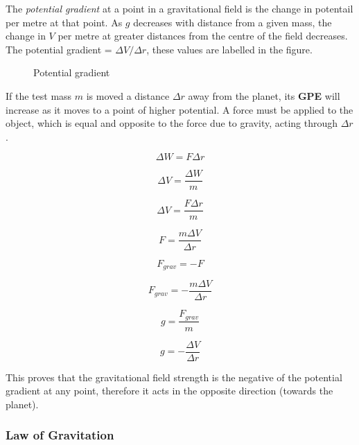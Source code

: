 \documentclass[12pt]{article}
\begin{document}
The \emph{potential gradient} at a point in a gravitational field is the change in potentail per metre at that point. As \(g\) decreases with distance from a given mass, the change in \(V\) per metre at greater distances from the centre of the field decreases. The potential gradient = \(\Delta V / \Delta r\), these values are labelled in the figure.

\begin{figure}[H]
\centering
{}
\caption{Potential gradient}
\end{figure}

If the test mass \(m\) is moved a distance \(\Delta r\) away from the planet, its \textbf{GPE} will increase as it moves to a point of higher potential. A force must be applied to the object, which is equal and opposite to the force due to gravity, acting through \(\Delta r\).

\[\Delta W = F \Delta r\]

\[\Delta V = \dfrac{\Delta W}{m}\]

\[\Delta V = \dfrac{F \Delta r}{m}\]

\[F = \dfrac{m \Delta V}{\Delta r}\]

\[F_{grav} = -F\]

\[F_{grav} = - \dfrac{m \Delta V}{\Delta r}\]

\[g = \dfrac{F_{grav}}{m}\]

\[g = - \dfrac{\Delta V}{\Delta r}\]

This proves that the gravitational field strength is the negative of the potential gradient at any point, therefore it acts in the opposite direction (towards the planet).

\subsubsection{Law of Gravitation}
\label{sec:orgc7d7097}
\end{document}
